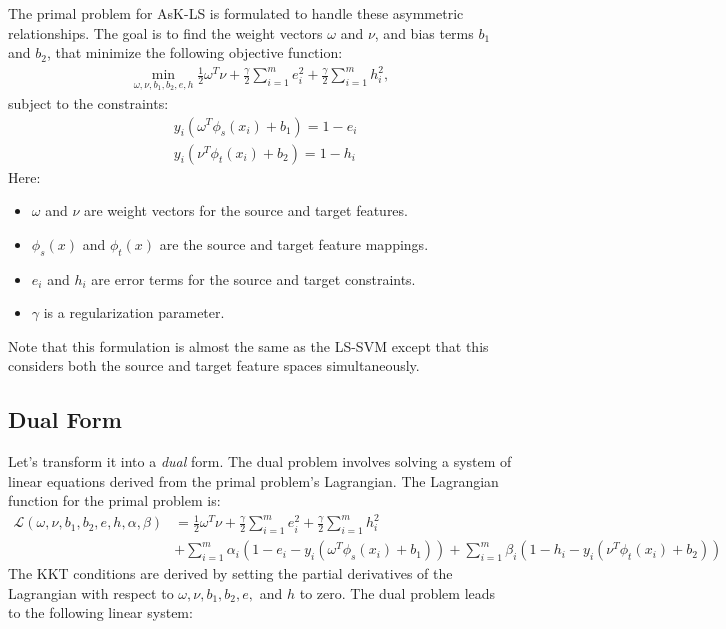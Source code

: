 The primal problem for AsK-LS is formulated to handle these asymmetric relationships. The goal is to find the weight vectors \( \omega \) and \( \nu \), and bias terms \( b_1 \) and \( b_2 \), that minimize the following objective function:
\begin{align*}
	\min_{\omega, \nu, b_1, b_2, e, h} \frac{1}{2} \omega^T \nu + \frac{\gamma}{2} \sum_{i=1}^m e_i^2 + \frac{\gamma}{2} \sum_{i=1}^m h_i^2, 
\end{align*}
subject to the constraints:
\begin{align*}
	& y_i (\omega^T \phi_s(x_i) + b_1) = 1 - e_i\\
	& y_i (\nu^T \phi_t(x_i) + b_2) = 1 - h_i
\end{align*}
Here:
\begin{itemize}
	\item \( \omega \) and \( \nu \) are weight vectors for the source and target features.
	\item \( \phi_s(x) \) and \( \phi_t(x) \) are the source and target feature mappings.
	\item \( e_i \) and \( h_i \) are error terms for the source and target constraints.
	\item \( \gamma \) is a regularization parameter.
\end{itemize}
Note that this formulation is almost the same as the LS-SVM except that this considers both the source and target feature spaces simultaneously.

\subsection{Dual Form}
Let's transform it into a \textit{dual} form. The dual problem involves solving a system of linear equations derived from the primal problem's Lagrangian. The Lagrangian function for the primal problem is:
\begin{align*}
	\mathcal{L}( \omega, \nu, b_1, b_2, e, h, \alpha, \beta) &= \frac{1}{2} \omega^T \nu + \frac{\gamma}{2} \sum_{i=1}^m e_i^2 + \frac{\gamma}{2} \sum_{i=1}^m h_i^2\\ 
		   &+ \sum_{i=1}^m \alpha_i (1 - e_i - y_i (\omega^T \phi_s(x_i) + b_1)) + \sum_{i=1}^m \beta_i (1 - h_i - y_i (\nu^T \phi_t(x_i) + b_2))
\end{align*}
The KKT conditions are derived by setting the partial derivatives of the Lagrangian with respect to \( \omega, \nu, b_1, b_2, e, \) and \( h \) to zero. The dual problem leads to the following linear system:

